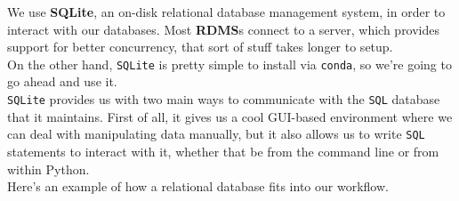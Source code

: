 \documentclass[english, 10pt]{article}
\begin{document}
\hfill \break We use \textbf{SQLite}, an on-disk relational database management system, in order to interact with our databases. Most \textbf{RDMS}s connect to a server, which provides support for better concurrency, that sort of stuff takes longer to setup.\\

On the other hand, \texttt{SQLite} is pretty simple to install via \texttt{conda}, so we're going to go ahead and use it.\\

\texttt{SQLite} provides us with two main ways to communicate with the \texttt{SQL} database that it maintains. First of all, it gives us a cool GUI-based environment where we can deal with manipulating data manually, but it also allows us to write \texttt{SQL} statements to interact with it, whether that be from the command line or from within Python.\\

Here's an example of how a relational database fits into our workflow.\\\\
\end{document}
